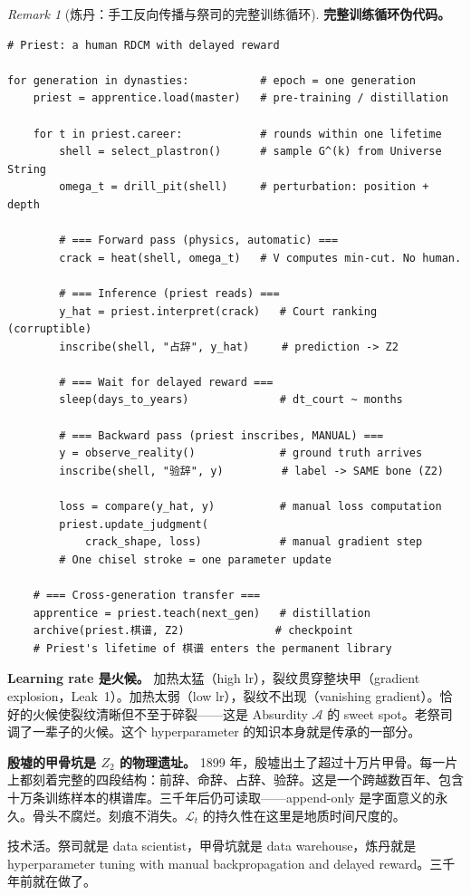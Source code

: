 \documentclass[11pt,a4paper]{article}
\theoremstyle{definition}
\theoremstyle{remark}
\newtheorem{remark}[theorem]{Remark}
\begin{document}
\begin{remark}[炼丹：手工反向传播与祭司的完整训练循环]
\textbf{完整训练循环伪代码。}

\begin{lstlisting}[caption={甲骨占卜训练循环 / Oracle Bone Training Loop}]
# Priest: a human RDCM with delayed reward

for generation in dynasties:           # epoch = one generation
    priest = apprentice.load(master)   # pre-training / distillation

    for t in priest.career:            # rounds within one lifetime
        shell = select_plastron()      # sample G^(k) from Universe String
        omega_t = drill_pit(shell)     # perturbation: position + depth
        
        # === Forward pass (physics, automatic) ===
        crack = heat(shell, omega_t)   # V computes min-cut. No human.
        
        # === Inference (priest reads) ===
        y_hat = priest.interpret(crack)   # Court ranking (corruptible)
        inscribe(shell, "占辞", y_hat)     # prediction -> Z2
        
        # === Wait for delayed reward ===
        sleep(days_to_years)              # dt_court ~ months
        
        # === Backward pass (priest inscribes, MANUAL) ===
        y = observe_reality()             # ground truth arrives
        inscribe(shell, "验辞", y)         # label -> SAME bone (Z2)
        
        loss = compare(y_hat, y)          # manual loss computation
        priest.update_judgment(             
            crack_shape, loss)            # manual gradient step
        # One chisel stroke = one parameter update
        
    # === Cross-generation transfer ===
    apprentice = priest.teach(next_gen)   # distillation
    archive(priest.棋谱, Z2)              # checkpoint
    # Priest's lifetime of 棋谱 enters the permanent library
\end{lstlisting}

\textbf{Learning rate 是火候。} 加热太猛（high lr），裂纹贯穿整块甲（gradient explosion，Leak~1）。加热太弱（low lr），裂纹不出现（vanishing gradient）。恰好的火候使裂纹清晰但不至于碎裂——这是 Absurdity $\mathcal{A}$ 的 sweet spot。老祭司调了一辈子的火候。这个 hyperparameter 的知识本身就是传承的一部分。

\textbf{殷墟的甲骨坑是 $Z_2$ 的物理遗址。} 1899 年，殷墟出土了超过十万片甲骨。每一片上都刻着完整的四段结构：前辞、命辞、占辞、验辞。这是一个跨越数百年、包含十万条训练样本的棋谱库。三千年后仍可读取——append-only 是字面意义的永久。骨头不腐烂。刻痕不消失。$\mathcal{L}_t$ 的持久性在这里是地质时间尺度的。

技术活。祭司就是 data scientist，甲骨坑就是 data warehouse，炼丹就是 hyperparameter tuning with manual backpropagation and delayed reward。三千年前就在做了。
\end{remark}
\end{document}
